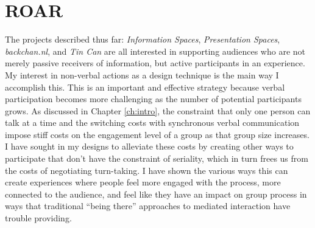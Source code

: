 \chapter{ROAR}



The projects described thus far: \emph{Information Spaces}, \emph{Presentation Spaces}, \emph{backchan.nl}, and \emph{Tin Can} are all interested in supporting audiences who are not merely passive receivers of information, but active participants in an experience. My interest in non-verbal actions as a design technique is the main way I accomplish this. This is an important and effective strategy because verbal participation becomes more challenging as the number of potential participants grows. As discussed in Chapter \ref{ch:intro}, the constraint that only one person can talk at a time and the switching costs with synchronous verbal communication impose stiff costs on the engagement level of a group as that group size increases. I have sought in my designs to alleviate these costs by creating other ways to participate that don't have the constraint of seriality, which in turn frees us from the costs of negotiating turn-taking. I have shown the various ways this can create experiences where people feel more engaged with the process, more connected to the audience, and feel like they have an impact on group process in ways that traditional ``being there'' approaches to mediated interaction have trouble providing.


